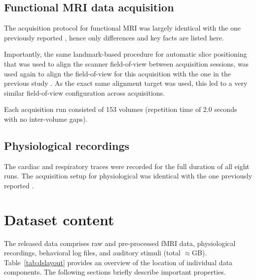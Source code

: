 \documentclass[10pt,a4paper,twocolumn]{article}
\begin{document}
\subsection*{Functional MRI data acquisition}

The acquisition protocol for functional MRI was largely identical with the one
previously reported \cite{HBI+14}, hence only differences and key facts are
listed here.

Importantly, the same landmark-based procedure for automatic slice positioning
that was used to align the scanner field-of-view between acquisition sessions,
was used again to align the field-of-view for this acquisition with the one in
the previous study \cite{HBI+14}. As the exact same alignment target was
used, this led to a very similar field-of-view configuration across
acquisitions.

Each acquisition run consisted of 153 volumes (repetition time of 2.0 seconds
with no inter-volume gaps).

\subsection*{Physiological recordings}

The cardiac and respiratory traces were recorded for the full duration of all
eight runs. The acquisition setup for physiological was identical with the one
previously reported \cite{HBI+14}.

\section*{Dataset content}

The released data comprises raw and pre-processed fMRI data, physiological
recordings, behavioral log files, and auditory stimuli (total
$\approx$\unit[95]{GB}). Table~\ref{tab:dslayout} provides an overview of the
location of individual data components. The following sections briefly describe
important properties.
\end{document}
